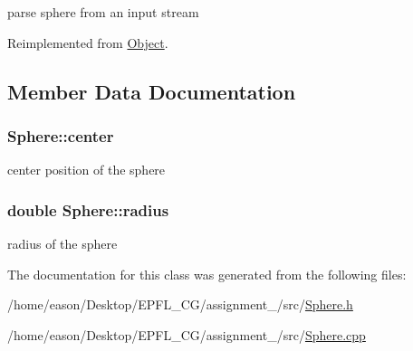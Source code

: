 parse sphere from an input stream 



Reimplemented from \hyperlink{structObject_ae7828b080c96e2226f3dc19823161d41}{Object}.



\subsection{Member Data Documentation}
\subsubsection[{\texorpdfstring{center}{center}}]{ Sphere\+::center\hspace{0.3cm}{\ttfamily [private]}}\hypertarget{classSphere_a06c913d87d0f6d172b4049bbf18dadf9}{}\label{classSphere_a06c913d87d0f6d172b4049bbf18dadf9}


center position of the sphere 

\subsubsection[{\texorpdfstring{radius}{radius}}]{\setlength{\rightskip}{0pt plus 5cm}double Sphere\+::radius\hspace{0.3cm}{\ttfamily [private]}}\hypertarget{classSphere_a45d6c6c870fac7c2a885ad2e226334ad}{}\label{classSphere_a45d6c6c870fac7c2a885ad2e226334ad}


radius of the sphere 



The documentation for this class was generated from the following files\+:\begin{DoxyCompactItemize}
\item 
/home/eason/\+Desktop/\+E\+P\+F\+L\+\_\+\+C\+G/assignment\+\_/src/\hyperlink{Sphere_8h}{Sphere.\+h}\item 
/home/eason/\+Desktop/\+E\+P\+F\+L\+\_\+\+C\+G/assignment\+\_/src/\hyperlink{Sphere_8cpp}{Sphere.\+cpp}\end{DoxyCompactItemize}
